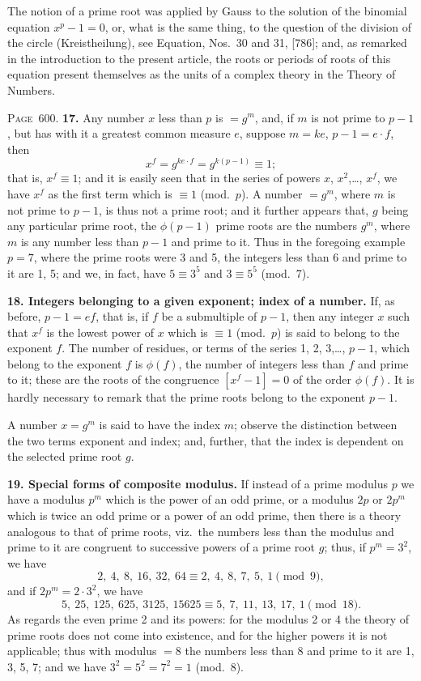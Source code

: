 \documentclass[11pt,a4paper]{article}
\theoremstyle{definition}
\begin{document}
The notion of a prime root was applied by Gauss to the solution of the binomial equation $x^p-1=0$, or, what is the same thing, to the question of the division of the circle (Kreistheilung), see Equation, Nos.~30 and 31, [786]; and, as remarked in the introduction to the present article, the roots or periods of roots of this equation present themselves as the units of a complex theory in the Theory of Numbers.

\newpage
\noindent\textsc{Page~600.} \textbf{17.} Any number $x$ less than $p$ is $=g^m$, and, if $m$ is not prime to $p-1$, but has with it a greatest common measure $e$, suppose $m=ke$, $p-1=e\cdot f$, then
\[
x^f=g^{ke\cdot f}=g^{k(p-1)}\equiv1;
\]
that is, $x^f\equiv1$; and it is easily seen that in the series of powers $x$, $x^2$,\ldots, $x^f$, we have $x^f$ as the first term which is $\equiv1$ (mod.\ $p$). A number $=g^m$, where $m$ is not prime to $p-1$, is thus not a prime root; and it further appears that, $g$ being any particular prime root, the $\phi(p-1)$ prime roots are the numbers $g^m$, where $m$ is any number less than $p-1$ and prime to it. Thus in the foregoing example $p=7$, where the prime roots were 3 and 5, the integers less than 6 and prime to it are 1, 5; and we, in fact, have $5\equiv3^5$ and $3\equiv5^5$ (mod.\ 7).

\textbf{18. Integers belonging to a given exponent; index of a number.} If, as before, $p-1=ef$, that is, if $f$ be a submultiple of $p-1$, then any integer $x$ such that $x^f$ is the lowest power of $x$ which is $\equiv1$ (mod.\ $p$) is said to belong to the exponent $f$. The number of residues, or terms of the series 1, 2, 3,\ldots, $p-1$, which belong to the exponent $f$ is $\phi(f)$, the number of integers less than $f$ and prime to it; these are the roots of the congruence $[x^f-1]=0$ of the order $\phi(f)$. It is hardly necessary to remark that the prime roots belong to the exponent $p-1$.

A number $x=g^m$ is said to have the index $m$; observe the distinction between the two terms exponent and index; and, further, that the index is dependent on the selected prime root $g$.

\textbf{19. Special forms of composite modulus.} If instead of a prime modulus $p$ we have a modulus $p^m$ which is the power of an odd prime, or a modulus $2p$ or $2p^m$ which is twice an odd prime or a power of an odd prime, then there is a theory analogous to that of prime roots, viz.\ the numbers less than the modulus and prime to it are congruent to successive powers of a prime root $g$; thus, if $p^m=3^2$, we have
\[
2,\ 4,\ 8,\ 16,\ 32,\ 64\equiv2,\ 4,\ 8,\ 7,\ 5,\ 1\pmod{9},
\]
and if $2p^m=2\cdot3^2$, we have
\[
5,\ 25,\ 125,\ 625,\ 3125,\ 15625\equiv5,\ 7,\ 11,\ 13,\ 17,\ 1\pmod{18}.
\]
As regards the even prime 2 and its powers: for the modulus 2 or 4 the theory of prime roots does not come into existence, and for the higher powers it is not applicable; thus with modulus $=8$ the numbers less than 8 and prime to it are 1, 3, 5, 7; and we have $3^2=5^2=7^2=1$ (mod.\ 8).
\end{document}
